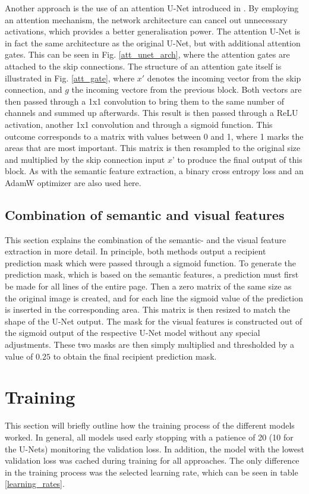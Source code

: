 \documentclass[conference]{IEEEtran}
\begin{document}
Another approach is the use of an attention U-Net introduced in \cite{ oktay2018attention}. By employing an attention mechanism, the network architecture can cancel out unnecessary activations, which provides a better generalisation power. The attention U-Net is in fact the same architecture as the original U-Net, but with additional attention gates. This can be seen in Fig. \ref{att_unet_arch}, where the attention gates are attached to the skip connections. The structure of an attention gate itself is illustrated in Fig. \ref{att_gate}, where $x'$ denotes the incoming vector from the skip connection, and $g$ the incoming vectore from the previous block. Both vectors are then passed through a 1x1 convolution to bring them to the same number of channels and summed up afterwards. This result is then passed through a ReLU activation, another 1x1 convolution and through a sigmoid function. This outcome corresponds to a matrix with values between 0 and 1, where 1 marks the areas that are most important. This matrix is then resampled to the original size and multiplied by the skip connection input $x’$ to produce the final output of this block. As with the semantic feature extraction, a binary cross entropy loss and an AdamW optimizer \cite{loshchilov2019decoupled} are also used here.

\subsection{Combination of semantic and visual features}\label{combinded_feat}
This section explains the combination of the semantic- and the visual feature extraction in more detail. In principle, both methods output a recipient prediction mask which were passed through a sigmoid function. To generate the prediction mask, which is based on the semantic features, a prediction must first be made for all lines of the entire page. Then a zero matrix of the same size as the original image is created, and for each line the sigmoid value of the prediction is inserted in the corresponding area. This matrix is then resized to match the shape of the U-Net output. The mask for the visual features is constructed out of the sigmoid output of the respective U-Net model without any special adjustments. These two masks are then simply multiplied and thresholded by a value of $0.25$ to obtain the final recipient prediction mask.

\section{Training}\label{training}
This section will briefly outline how the training process of the different models worked. In general, all models used early stopping with a patience of 20 (10 for the U-Nets) monitoring the validation loss. In addition, the model with the lowest validation loss was cached during training for all approaches. The only difference in the training process was the selected learning rate, which can be seen in table \ref{learning_rates}.
\end{document}
